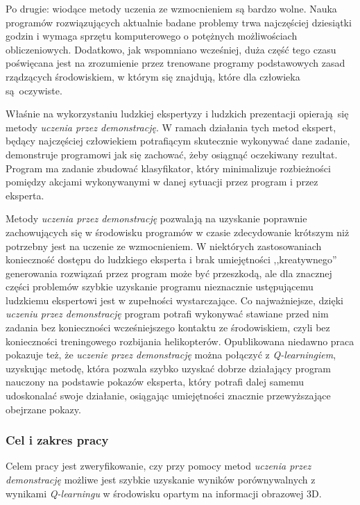 Po drugie: wiodące metody uczenia ze wzmocnieniem są bardzo wolne. Nauka programów rozwiązujących aktualnie badane problemy trwa najczęściej dziesiątki godzin i wymaga sprzętu komputerowego o potężnych możliwościach obliczeniowych. Dodatkowo, jak wspomniano wcześniej, duża część tego czasu poświęcana jest na zrozumienie przez trenowane programy podstawowych zasad rządzących środowiskiem, w którym się znajdują, które dla człowieka są oczywiste.

Właśnie na wykorzystaniu ludzkiej ekspertyzy i ludzkich prezentacji opierają się metody \textit{uczenia przez demonstrację}. W ramach działania tych metod ekspert, będący najczęściej człowiekiem potrafiącym skutecznie wykonywać dane zadanie, demonstruje programowi jak się zachować, żeby osiągnąć oczekiwany rezultat. Program ma zadanie zbudować klasyfikator, który minimalizuje rozbieżności pomiędzy akcjami wykonywanymi w danej sytuacji przez program i przez eksperta.

Metody \textit{uczenia przez demonstrację} pozwalają na uzyskanie poprawnie zachowujących się w środowisku programów w czasie zdecydowanie krótszym niż potrzebny jest na uczenie ze wzmocnieniem. W niektórych zastosowaniach konieczność dostępu do ludzkiego eksperta i brak umiejętności ,,kreatywnego'' generowania rozwiązań przez program może być przeszkodą, ale dla znacznej części problemów szybkie uzyskanie programu nieznacznie ustępującemu ludzkiemu ekspertowi jest w zupełności wystarczające. Co najważniejsze, dzięki \textit{uczeniu przez demonstrację} program potrafi wykonywać stawiane przed nim zadania bez konieczności wcześniejszego kontaktu ze środowiskiem, czyli bez konieczności treningowego rozbijania helikopterów. Opublikowana niedawno praca \cite{DBLP:journals/corr/HesterVPLSPSDOA17} pokazuje też, że \textit{uczenie przez demonstrację} można połączyć z \textit{Q-learningiem}, uzyskując metodę, która pozwala szybko uzyskać dobrze działający program nauczony na podstawie pokazów eksperta, który potrafi dalej samemu udoskonalać swoje działanie, osiągając umiejętności znacznie przewyższające obejrzane pokazy.


\subsubsection{Cel i zakres pracy}

Celem pracy jest zweryfikowanie, czy przy pomocy metod \textit{uczenia przez demonstrację} możliwe jest szybkie uzyskanie wyników porównywalnych z wynikami \textit {Q-learningu} w środowisku opartym na informacji obrazowej 3D.

